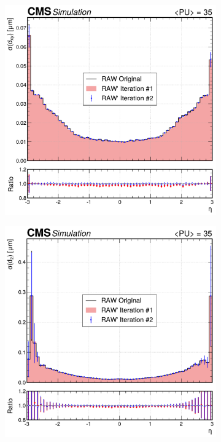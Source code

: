 \begin{figure}[!htbp]
        \centering
        \begin{subfigure}[b]{0.49\textwidth}
            \centering
            \includegraphics[width=\textwidth]{Figures/Chapter5/resolution_comparison_dxy_eta.pdf}
            \caption{}
        \end{subfigure}
        \begin{subfigure}[b]{0.49\textwidth}
            \centering
            \includegraphics[width=\textwidth]{Figures/Chapter5/resolution_comparison_dz_eta.pdf}
            \caption{}
        \end{subfigure}
        

\end{figure}
